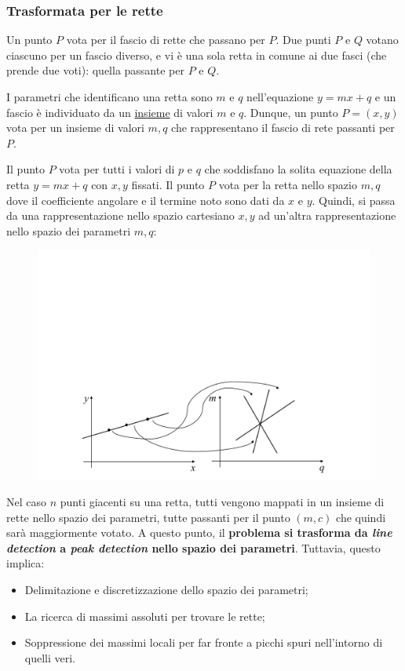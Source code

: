 \documentclass[a4paper]{article}
\begin{document}
	\subsubsection{Trasformata per le rette}
	
	Un punto $P$ vota per il fascio di rette che passano per $P$. Due punti $P$ e $Q$ votano ciascuno per un fascio diverso, e vi è una sola retta in comune ai due fasci (che prende due voti): quella passante per $P$ e $Q$.\newline
	
	\noindent
	I parametri che identificano una retta sono $m$ e $q$ nell'equazione $y = mx + q$ e un fascio è individuato da un \underline{insieme} di valori $m$ e $q$. Dunque, un punto $P = \left(x,y\right)$ vota per un insieme di valori $m,q$ che rappresentano il fascio di rete passanti per $P$.\newline
	
	\noindent
	Il punto $P$ vota per tutti i valori di $p$ e $q$ che soddisfano la solita equazione della retta $y = mx+q$ con $x,y$ fissati. Il punto $P$ vota per la retta nello spazio $m,q$ dove il coefficiente angolare e il termine noto sono dati da $x$ e $y$. Quindi, si passa da una rappresentazione nello spazio cartesiano $x,y$ ad un'altra rappresentazione nello spazio dei parametri $m,q$:
	\begin{figure}[!htp]
		\centering
		\includegraphics[width=\textwidth]{img/trasformata_hough_rette.pdf}
	\end{figure}
	
	\noindent
	Nel caso $n$ punti giacenti su una retta, tutti vengono mappati in un insieme di rette nello spazio dei parametri, tutte passanti per il punto $\left(m,c\right)$ che quindi sarà maggiormente votato. A questo punto, il \textbf{problema si trasforma da \emph{line detection} a \emph{peak detection} nello spazio dei parametri}.\newline
	Tuttavia, questo implica:
	\begin{itemize}
		\item Delimitazione e discretizzazione dello spazio dei parametri;
		\item La ricerca di massimi assoluti per trovare le rette;
		\item Soppressione dei massimi locali per far fronte a picchi spuri nell'intorno di quelli veri.
	\end{itemize}\newpage
	
\end{document}
